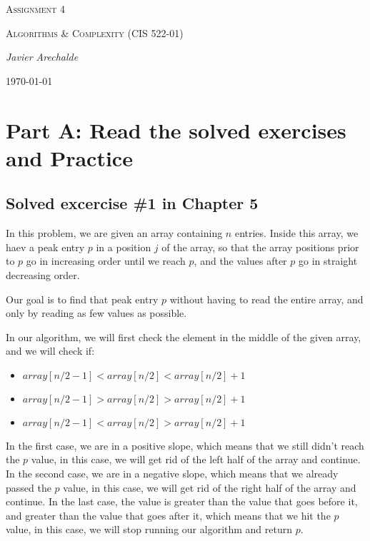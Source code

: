 \documentclass{article}
\begin{document}
\begin{titlepage}
	\centering
	{\scshape\LARGE Assignment 4\par}
	\vspace{1cm}
	{\scshape\Large Algorithms \& Complexity (CIS 522-01)\par}
	\vspace{1.5cm}
	{\Large\itshape Javier Arechalde\par}
	\vfill
	{\large \today\par}
\end{titlepage}

\section*{Part A: Read the solved exercises and Practice}

\subsection*{Solved excercise \#1 in Chapter 5}

In this problem, we are given an array containing $n$ entries. Inside this array, we haev a peak entry $p$ in a position $j$ of the array, so that the array positions prior to $p$ go in increasing order until we reach $p$, and the values after $p$ go in straight decreasing order.

Our goal is to find that peak entry $p$ without having to read the entire array, and only by reading as few values as possible. 

In our algorithm, we will first check the element in the middle of the given array, and we will check if:

\begin{itemize}
 \item $array[n/2-1]<array[n/2]<array[n/2]+1$
 \item $array[n/2-1]>array[n/2]>array[n/2]+1$
 \item $array[n/2-1]<array[n/2]>array[n/2]+1$
\end{itemize}

In the first case, we are in a positive slope, which means that we still didn't reach the $p$ value, in this case, we will get rid of the left half of the array and continue. In the second case, we are in a negative slope, which means that we already passed the $p$ value, in this case, we will get rid of the right half of the array and continue. In the last case, the value is greater than the value that goes before it, and greater than the value that goes after it, which means that we hit the $p$ value, in this case, we will stop running our algorithm and return $p$.
\end{document}
